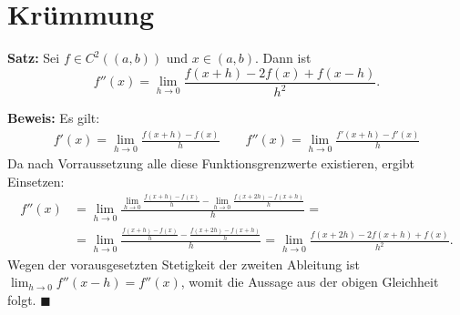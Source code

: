 \documentclass[a4paper]{article}
\theoremstyle{definition}
\begin{document}
\section{Krümmung}
\textbf{Satz:} Sei $f \in C^2((a,b))$ und $x \in (a,b)$. Dann ist 
\[
f''(x) = \lim_{h \to 0} \frac{f(x+h) -2f(x) + f(x-h)}{h^2}.
\]

\textbf{Beweis:}
Es gilt:
\begin{align*}
f'(x) = \lim_{h \to 0} \frac{f(x+h)-f(x)}{h} \qquad  f''(x) = \lim_{h \to 0} \frac{f'(x+h)-f'(x)}{h}
\end{align*}
Da nach Vorraussetzung alle diese Funktionsgrenzwerte existieren, ergibt Einsetzen:
\begin{align*}
f''(x) &= \lim_{h \to 0} \frac{\lim_{h \to 0} \frac{f(x+h)-f(x)}{h}-\lim_{h \to 0} \frac{f(x+2h)-f(x+h)}{h}}{h} = \\
&=\lim_{h \to 0}  \frac{\frac{f(x+h)-f(x)}{h}- \frac{f(x+2h)-f(x+h)}{h}}{h} = \lim_{h \to 0} \frac{f(x+2h) -2f(x+h) + f(x)}{h^2}.
\end{align*}
Wegen der vorausgesetzten Stetigkeit der zweiten Ableitung ist $\lim_{h \to 0} f''(x-h)=f''(x)$, womit die Aussage aus der obigen Gleichheit folgt. \hfill $\blacksquare$
\end{document}
